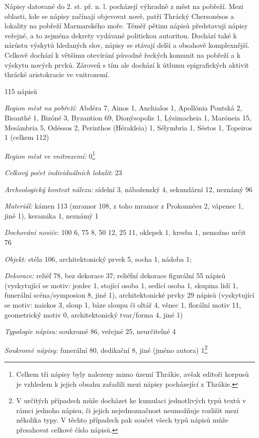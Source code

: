Nápisy datované do 2. st. př. n. l. pocházejí výhradně z měst na pobřeží. Mezi oblasti, kde se nápisy začínají objevovat nově, patří Thrácký Chersonésos a lokality na pobřeží Marmarského moře. Téměř pětinu nápisů představují nápisy veřejné, a to zejména dekrety vydávané politickou autoritou. Dochází také k nárůstu výskytů hledaných slov, nápisy se stávají delší a obsahově komplexnější. Celkově dochází k většímu otevírání původně řeckých komunit na pobřeží a k výskytu nových prvků. Zároveň s tím ale dochází k útlumu epigrafických aktivit thrácké aristokracie ve vnitrozemí.

\placetable[none]{}
\starttable[|l|]
\HL
{} 115 nápisů

{\em Region měst na pobřeží:} Abdéra 7, Ainos 1, Anchialos 1, Apollónia Pontská 2, Bisanthé 1, Bizóné 3, Byzantion 69, Dionýsopolis 1, Lýsimacheia 1, Maróneia 15, Mesámbria 5, Odéssos 2, Perinthos (Hérakleia) 1, Sélymbria 1, Séstos 1, Topeiros 1 (celkem 112)

{\em Region měst ve vnitrozemí:} 0\footnote{Celkem tři nápisy byly nalezeny mimo území Thrákie, avšak editoři korpusů je vzhledem k jejich obsahu zařadili mezi nápisy pocházející z Thrákie.}

{\em Celkový počet individuálních lokalit}: 23

{\em Archeologický kontext nálezu:} sídelní 3, náboženský 4, sekundární 12, neznámý 96

{\em Materiál:} kámen 113 (mramor 108, z toho mramor z Prokonnésu 2, vápenec 1, jiné 1), keramika 1, neznámý 1

{\em Dochování nosiče}: 100  6, 75  8, 50  12, 25  11, oklepek 1, kresba 1, nemožno určit 76

{\em Objekt:} stéla 106, architektonický prvek 5, socha 1, nádoba 1;

{\em Dekorace:} reliéf 78, bez dekorace 37; reliéfní dekorace figurální 55 nápisů (vyskytující se motiv: jezdec 1, stojící osoba 1, sedící osoba 1, skupina lidí 1, funerální scéna/symposion 8, jiné 1), architektonické prvky 29 nápisů (vyskytující se motiv: naiskos 3, sloup 1, báze sloupu či oltář 4, věnec 1, florální motiv 11, geometrický motiv 0, architektonický tvar/forma 4, jiné 1)

{\em Typologie nápisu:} soukromé 86, veřejné 25, neurčitelné 4

{\em Soukromé nápisy:} funerální 80, dedikační 8, jiné (jméno autora) 1\footnote{V určitých případech může docházet ke kumulaci jednotlivých typů textů v rámci jednoho nápisu, či jejich nejednoznačnost neumožňuje rozlišit mezi několika typy. V těchto případech pak součet všech typů nápisů může přesahovat celkové číslo nápisů.}

